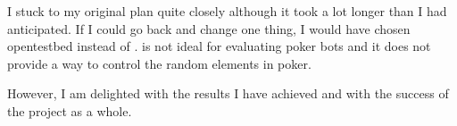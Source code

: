I stuck to my original plan quite closely although it took a lot longer than I had anticipated. If I could go back and change one thing, I would have chosen opentestbed instead of \pa. \pa is not ideal for evaluating poker bots and it does not provide a way to control the random elements in poker.


However, I am delighted with the results I have achieved and with the success of the project as a whole.







